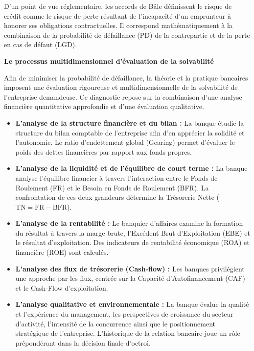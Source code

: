 D'un point de vue réglementaire, les accords de Bâle définissent le risque de crédit comme le risque de perte résultant de l'incapacité d'un emprunteur à honorer ses obligations contractuelles. Il correspond mathématiquement à la combinaison de la probabilité de défaillance (PD) de la contrepartie et de la perte en cas de défaut (LGD).

\medskip\textbf{Le processus multidimensionnel d'évaluation de la solvabilité}

Afin de minimiser la probabilité de défaillance, la théorie et la pratique bancaires imposent une évaluation rigoureuse et multidimensionnelle de la solvabilité de l'entreprise demandeuse. Ce diagnostic repose sur la combinaison d'une analyse financière quantitative approfondie et d'une évaluation qualitative.

\begin{itemize}
  \item \textbf{L'analyse de la structure financière et du bilan :} La banque étudie la structure du bilan comptable de l'entreprise afin d'en apprécier la solidité et l'autonomie. Le ratio d'endettement global (Gearing) permet d'évaluer le poids des dettes financières par rapport aux fonds propres.

  \item \textbf{L'analyse de la liquidité et de l'équilibre de court terme :} La banque analyse l'équilibre financier à travers l'interaction entre le Fonds de Roulement (FR) et le Besoin en Fonds de Roulement (BFR). La confrontation de ces deux grandeurs détermine la Trésorerie Nette (\(\text{TN} = \text{FR} - \text{BFR}\)).

  \item \textbf{L'analyse de la rentabilité :} Le banquier d'affaires examine la formation du résultat à travers la marge brute, l'Excédent Brut d'Exploitation (EBE) et le résultat d'exploitation. Des indicateurs de rentabilité économique (ROA) et financière (ROE) sont calculés.

  \item \textbf{L'analyse des flux de trésorerie (Cash-flow) :} Les banques privilégient une approche par les flux, centrée sur la Capacité d'Autofinancement (CAF) et le Cash-Flow d'exploitation.

  \item \textbf{L'analyse qualitative et environnementale :} La banque évalue la qualité et l'expérience du management, les perspectives de croissance du secteur d'activité, l'intensité de la concurrence ainsi que le positionnement stratégique de l'entreprise. L'historique de la relation bancaire joue un rôle prépondérant dans la décision finale d'octroi.
\end{itemize}

